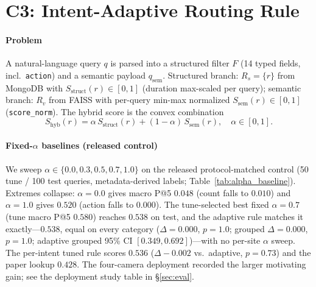 ﻿\documentclass[conference]{IEEEtran}
\theoremstyle{plain}
\begin{document}
\section{C3: Intent-Adaptive Routing Rule}\label{sec:adaptive_alpha}

\paragraph*{Problem}
A natural-language query $q$ is parsed into a structured filter $F$ (14 typed fields, incl.\ \texttt{action}) and a semantic payload $q_{\text{sem}}$. Structured branch: $R_s=\{r\}$ from MongoDB with $S_{\text{struct}}(r)\in[0,1]$ (duration max-scaled per query); semantic branch: $R_v$ from FAISS with per-query min-max normalized $S_{\text{sem}}(r)\in[0,1]$ (\texttt{score\_norm}). The hybrid score is the convex combination
\begin{equation}
S_{\text{hyb}}(r) = \alpha\, S_{\text{struct}}(r) + (1-\alpha)\, S_{\text{sem}}(r),\quad \alpha\in[0,1].
\label{eq:hybrid_score}
\end{equation}

\paragraph*{Fixed-\texorpdfstring{$\alpha$}{alpha} baselines (released control)}
We sweep $\alpha\in\{0.0,\allowbreak 0.3,\allowbreak 0.5,\allowbreak 0.7,\allowbreak 1.0\}$ on the released protocol-matched control (50 tune / 100 test queries, metadata-derived labels; Table~\ref{tab:alpha_baseline}). Extremes collapse: $\alpha{=}0.0$ gives macro P@5 $0.048$ (count falls to $0.010$) and $\alpha{=}1.0$ gives $0.520$ (action falls to $0.000$). The tune-selected best fixed $\alpha{=}0.7$ (tune macro P@5 $0.580$) reaches $0.538$ on test, and the adaptive rule matches it exactly---$0.538$, equal on every category ($\Delta{=}0.000$, $p{=}1.0$; grouped $\Delta{=}0.000$, $p{=}1.0$; adaptive grouped 95\% CI $[0.349,0.692]$)---with no per-site $\alpha$ sweep. The per-intent tuned rule scores $0.536$ ($\Delta{-}0.002$ vs.\ adaptive, $p{=}0.73$) and the paper lookup $0.428$. The four-camera deployment recorded the larger motivating gain; see the deployment study table in \S\ref{sec:eval}.
\end{document}
